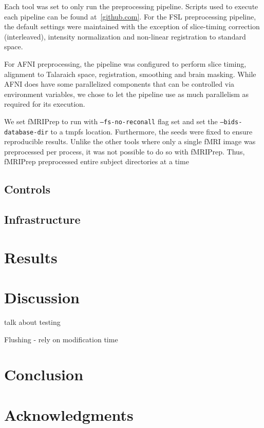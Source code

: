 \documentclass[10pt,journal,compsoc]{IEEEtran}
\begin{document}
Each tool was set to only run the preprocessing pipeline. Scripts used to execute each pipeline can be found at~\ref{github.com}.
For the FSL preprocessing pipeline, the default settings were maintained with the exception of slice-timing correction (interleaved),
intensity normalization and non-linear registration to standard space.


For AFNI preprocessing, the pipeline was configured to perform slice timing, alignment to Talaraich space, registration, smoothing
and brain masking. While AFNI does have some parallelized components that can be controlled via environment variables, we chose to let 
the pipeline use as much parallelism as required for its execution.

We set fMRIPrep to run with \texttt{--fs-no-reconall} flag set and set the \texttt{--bids-database-dir} to a tmpfs location. 
Furthermore, the seeds were fixed to ensure reproducible results. Unlike the other tools where only a single fMRI image was preprocessed
per process, it was not possible to do so with fMRIPrep. Thus, fMRIPrep preprocessed entire subject directories at a time




\subsection{Controls}
\subsection{Infrastructure}

\section{Results}


\section{Discussion}
talk about testing


Flushing - rely on modification time
\section{Conclusion}
%


\ifCLASSOPTIONcompsoc
  \section*{Acknowledgments}
\else
\end{document}
